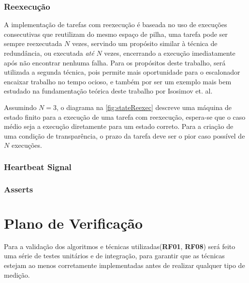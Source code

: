 \subsubsection{Reexecução}

A implementação de tarefas com reexecução é baseada no uso de execuções consecutivas que reutilizam do mesmo espaço de pilha, uma tarefa pode ser sempre reexecutada $N$ vezes, servindo um propósito similar à técnica de redundância, ou executada \textit{até} $N$ vezes, encerrando a execução imediatamente após não encontrar nenhuma falha. Para os propósitos deste trabalho, será utilizada a segunda técnica, pois permite mais oportunidade para o escalonador encaixar trabalho no tempo ocioso, e também por ser um exemplo mais bem estudado na fundamentação teórica deste trabalho por Isosimov et. al.

Assumindo $N = 3$, o diagrama na \autoref{fig:stateReexec} descreve uma máquina de estado finito para a execução de uma tarefa com reexecução, espera-se que o caso médio seja a execução diretamente para um estado correto. Para a criação de uma condição de transparência, o prazo da tarefa deve ser o pior caso possível de $N$ execuções.


\subsubsection{Heartbeat Signal}

\subsubsection{Asserts}


\section{Plano de Verificação}

Para a validação dos algoritmos e técnicas utilizadas(\textbf{RF01}, \textbf{RF08}) será feito uma série de testes unitários e de integração, para garantir que as técnicas estejam ao menos corretamente implementadas antes de realizar qualquer tipo de medição.


